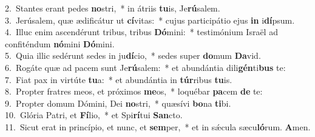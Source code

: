 {2.~}Stantes erant pedes \textbf{no}stri,~* in átriis \textbf{tu}is, Je\textbf{rú}salem.\\
{3.~}Jerúsalem, quæ ædificátur ut \textbf{cí}vitas:~* cujus participátio ejus \textbf{in} i\textbf{dí}psum.\\
{4.~}Illuc enim ascendérunt tribus, tribus \textbf{Dó}mini:~* testimónium Israël ad confiténdum \textbf{nó}mini \textbf{Dó}mini.\\
{5.~}Quia illic sedérunt sedes in ju\textbf{dí}cio,~* sedes super \textbf{do}mum \textbf{Da}vid.\\
{6.~}Rogáte quæ ad pacem sunt Je\textbf{rú}salem:~* et abundántia dili\textbf{gén}ti\textbf{bus} te:\\
{7.~}Fiat pax in virtúte \textbf{tu}a:~* et abundántia in \textbf{túr}ribus \textbf{tu}is.\\
{8.~}Propter fratres meos, et próximos \textbf{me}os,~* loquébar \textbf{pa}cem \textbf{de} te:\\
{9.~}Propter domum Dómini, Dei \textbf{no}stri,~* quæsívi \textbf{bo}na \textbf{ti}bi.\\
{10.~}Glória Patri, et \textbf{Fí}lio,~* et Spi\textbf{rí}tui \textbf{San}cto.\\
{11.~}Sicut erat in princípio, et nunc, et \textbf{sem}per,~* et in sǽcula sæcu\textbf{ló}rum. \textbf{A}men.\\
